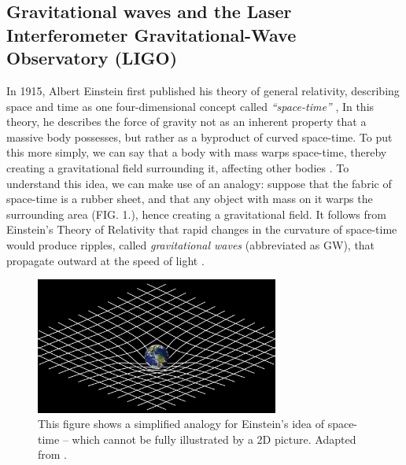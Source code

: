 \documentclass[preprint,
letterpaper,
 amsmath,amssymb,
 aps,
]{revtex4-2}
\begin{document}
\subsection{Gravitational waves and the Laser Interferometer Gravitational-Wave Observatory (LIGO)} \label{gw and ligo}
In 1915, Albert Einstein first published his theory of general relativity, describing space and time as one four-dimensional concept called \textit{``space-time''} \cite{maggiore_2008}, In this theory, he describes the force of gravity not as an inherent property that a massive body possesses, but rather as a byproduct of curved space-time. To put this more simply, we can say that a body with mass warps space-time, thereby creating a gravitational field surrounding it, affecting other bodies \cite{carlip}. To understand this idea, we can make use of an analogy: suppose that the fabric of space-time is a rubber sheet, and that any object with mass on it warps the surrounding area (FIG. 1.), hence creating a gravitational field. It follows from Einstein's Theory of Relativity that rapid changes in the curvature of space-time would produce ripples, called \textit{gravitational waves} (abbreviated as GW), that propagate outward at the speed of light  \cite{JSTORLIGO}.

\begin{figure}[t]
\includegraphics[width=8cm]{genral.png}
\caption{This figure shows a simplified analogy for Einstein's idea of space-time – which cannot be fully illustrated by a 2D picture. Adapted from \cite{mattson}.}
\centering
\end{figure}
\end{document}
